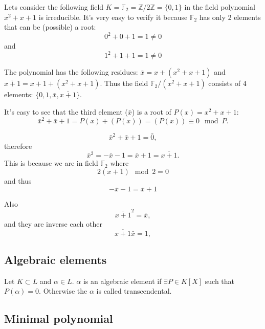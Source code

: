 \begin{example}
  Lets consider the following field
  $K = \mathbb{F}_2 = \mathbb{Z}/2\mathbb{Z} = \{0,1\}$ in the
  field polynomial $x^2+x+1$ is irreducible. It's very easy to verify
  it because $\mathbb{F}_2$ has only 2 elements that can be (possible)
  a root:
  \[
  0^2+0+1 = 1\ne 0
  \]
  and
  \[
  1^2+1+1 = 1\ne 0
  \]
  
  The polynomial has the following
  residues: $\bar{x} = x + \left(x^2+x+1\right)$ and
  $\overline{x + 1} = x + 1 + \left(x^2+x+1\right)$. Thus the field
  $\mathbb{F}_2/\left(x^2+x+1\right)$ consists of 4 elements:
  $\{0, 1, \bar{x}, \overline{x+1}\}$.

  It's easy to see that the third element ($\bar{x}$) is a root of
  $P(x) = x^2+x+1$:
  \[
  \bar{x}^2 + \bar{x} + 1 =
  P(x) + \left(P(x)\right) = \left(P(x)\right) \equiv 0 \mod P.
  \]
  
  \[
  \bar{x}^2 + \bar{x} + 1 = \bar{0},
  \]
  therefore 
  \[
  \bar{x}^2 = - \bar{x} - 1 = \bar{x} + 1 = \overline{x+1}.
  \]
  This is because we are in field $\mathbb{F}_2$ where
  \[
  2 \left(x + 1\right) \mod 2 = 0 
  \]
  and thus
  \[
  - \bar{x} - 1 = \bar{x} + 1
  \]
  
  Also
  \[
  \overline{x+1}^2 = \bar{x},
  \]
  and they are inverse each other
  \[
  \overline{x+1} \bar{x} = 1,
  \]
  \label{ex:F2overP}
\end{example}

\subsection{Algebraic elements}

\begin{definition}
  Let $K \subset L$ and $\alpha \in L$. $\alpha$ is an algebraic
  element if $\exists P \in K\left[X\right]$ such that
    $P\left(\alpha\right) = 0$. Otherwise the $\alpha$ is called
    transcendental.
  \label{def:algebraicelement}
\end{definition}

\subsection{Minimal polynomial}

